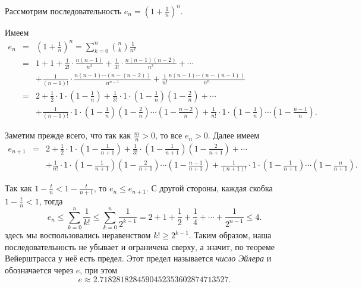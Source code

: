 \begin{example}
    Рассмотрим последовательность $e_n =\left(1 + \frac{1}{n} \right)^n$.

    Имеем
    \begin{eqnarray*}
        e_n &=& \left(1 + \frac{1}{n} \right)^n = \sum_{k=0}^n \binom{n}{k} \frac{1}{n^k}\\
        &=& 1 + 1 + \frac{1}{2!} \cdot \frac{n(n-1)}{n^2} + \frac{1}{3!}\cdot \frac{n(n-1)(n-2)}{n^3} + \cdots \\
        && + \frac{1}{(n-1)!} \cdot \frac{n(n-1)\cdots (n-(n-2))}{n^{n-1}} + \frac{1}{n!} \frac{n(n-1)\cdots (n-(n-1))}{n^n} \\
        &=& 2 + \frac{1}{2} \cdot 1\cdot \left(1-\frac{1}{n} \right) + \frac{1}{3!} \cdot 1 \cdot \left(1 - \frac{1}{n} \right) \left(1 - \frac{2}{n} \right)  + \cdots \\
        && + \frac{1}{(n-1)!} \cdot 1 \cdot \left(1 - \frac{1}{n} \right) \left(1 - \frac{2}{n} \right) \cdots \left(1 - \frac{n-2}{n} \right) + \frac{1}{n!} \cdot 1 \cdot \left(1 - \frac{1}{n} \right) \cdots \left(1 - \frac{n-1}{n} \right).
    \end{eqnarray*}

Заметим прежде всего, что так как $\frac{m}{n} >0$, то все $e_n >0$. Далее имеем
\begin{eqnarray*}
     e_{n+1} &=& 2 + \frac{1}{2}\cdot 1 \cdot\left(1 - \frac{1}{n+1} \right) + \frac{1}{3!} \cdot \left(1 - \frac{1}{n+1} \right)\left(1 - \frac{2}{n+1} \right) + \cdots \\
 && + \frac{1}{n!} \cdot 1 \cdot \left(1 - \frac{1}{n+1} \right) \left(1 - \frac{2}{n+1} \right) \cdots \left(1 - \frac{n-1}{n+1} \right) + \frac{1}{(n+1)!} \cdot 1 \cdot \left(1 - \frac{1}{n+1} \right) \cdots \left(1 - \frac{n}{n+1} \right).
\end{eqnarray*}

Так как $1 - \frac{t}{n} < 1 - \frac{t}{n+1}$, то $e_n \le e_{n+1}$. С другой стороны, каждая скобка $1- \frac{t}{n} <1$, тогда
\[
e_n \le \sum_{k=0}^n \frac{1}{k!} \le \sum_{k=0}^n \frac{1}{2^{k-1}} = 2 + 1 + \frac{1}{2} + \frac{1}{4} + \cdots + \frac{1}{2^{n-1}} \le 4.
\]
здесь мы воспользовались неравенством $k! \ge 2^{k-1}$. Таким образом, наша последовательность не убывает и ограничена сверху, а значит, по теореме Вейерштрасса у неё есть предел. Этот предел называется \textit{число Эйлера} и обозначается через $e$, при этом
$$e \approx 2.7182818284590452353602874713527.$$

\end{example}



